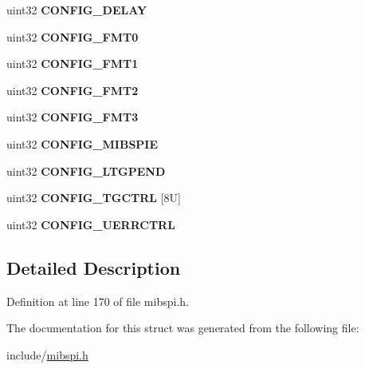 \begin{DoxyCompactItemize}
\item 
\mbox{\label{structmibspi__config__reg_a646a14383acb9138052c283660c30be6}} 
uint32 {\bfseries C\+O\+N\+F\+I\+G\+\_\+\+D\+E\+L\+AY}
\item 
\mbox{\label{structmibspi__config__reg_aab0ea9aa5396e9b951fe592ceadb83a7}} 
uint32 {\bfseries C\+O\+N\+F\+I\+G\+\_\+\+F\+M\+T0}
\item 
\mbox{\label{structmibspi__config__reg_a96dfea7ddc7eae63d88e1b0ecd0f600e}} 
uint32 {\bfseries C\+O\+N\+F\+I\+G\+\_\+\+F\+M\+T1}
\item 
\mbox{\label{structmibspi__config__reg_ad0d87e26a5f5e02787d44bdd4b0b5b6a}} 
uint32 {\bfseries C\+O\+N\+F\+I\+G\+\_\+\+F\+M\+T2}
\item 
\mbox{\label{structmibspi__config__reg_a7599845af3ec63631584cf23a8c927d6}} 
uint32 {\bfseries C\+O\+N\+F\+I\+G\+\_\+\+F\+M\+T3}
\item 
\mbox{\label{structmibspi__config__reg_abd25d5443ceb6b317e196dcc5e5408a4}} 
uint32 {\bfseries C\+O\+N\+F\+I\+G\+\_\+\+M\+I\+B\+S\+P\+IE}
\item 
\mbox{\label{structmibspi__config__reg_ad4ba51b1209e6f51f4a81be974e629bb}} 
uint32 {\bfseries C\+O\+N\+F\+I\+G\+\_\+\+L\+T\+G\+P\+E\+ND}
\item 
\mbox{\label{structmibspi__config__reg_a07facfbac238876786b48e65b02e5164}} 
uint32 {\bfseries C\+O\+N\+F\+I\+G\+\_\+\+T\+G\+C\+T\+RL} \mbox{[}8\+U\mbox{]}
\item 
\mbox{\label{structmibspi__config__reg_aad60a977f83116c8bd90a2fc447a85d2}} 
uint32 {\bfseries C\+O\+N\+F\+I\+G\+\_\+\+U\+E\+R\+R\+C\+T\+RL}
\end{DoxyCompactItemize}


\subsection{Detailed Description}


Definition at line 170 of file mibspi.\+h.



The documentation for this struct was generated from the following file\+:\begin{DoxyCompactItemize}
\item 
include/\mbox{\hyperlink{mibspi_8h}{mibspi.\+h}}\end{DoxyCompactItemize}
